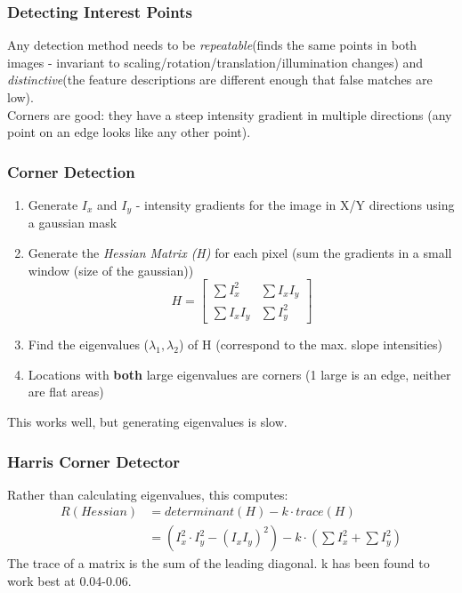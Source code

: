 \subsubsection{Detecting Interest Points}
Any detection method needs to be \emph{repeatable}(finds the same points in both images - invariant to scaling/rotation/translation/illumination changes) and \emph{distinctive}(the feature descriptions are different enough that false matches are low). \\

Corners are good: they have a steep intensity gradient in multiple directions (any point on an edge looks like any other point). 

\subsubsection{Corner Detection}
\begin{enumerate}
    \item Generate $I_x$ and $I_y$ - intensity gradients for the image in X/Y directions using a gaussian mask
    \item Generate the \emph{Hessian Matrix (H)} for each pixel (sum the gradients in a small window (size of the gaussian))
    \begin{equation}
    H = \begin{bmatrix}
            \sum I_x^2 & \sum I_xI_y \\
            \sum I_xI_y & \sum I_y^2
            \end{bmatrix}
    \end{equation}
    \item Find the eigenvalues ($\lambda_1,\lambda_2$) of H (correspond to the max. slope intensities)
    \item Locations with \textbf{both} large eigenvalues are corners (1 large is an edge, neither are flat areas)
\end{enumerate}
This works well, but generating eigenvalues is slow.

\subsubsection{Harris Corner Detector}
Rather than calculating eigenvalues, this computes:
\begin{align}
    R(Hessian) &= determinant(H) - k \cdot trace(H) \nonumber \\
               &= (I_x^2\cdot I_y^2 - (I_xI_y)^2) - k \cdot (\sum I_x^2 + \sum I_y^2)
\end{align}
The trace of a matrix is the sum of the leading diagonal. k has been found to work best at 0.04-0.06.\\

